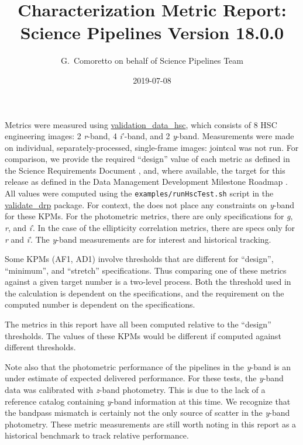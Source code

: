 \documentclass[DM,lsstdraft,toc]{lsstdoc}
\title[V18.0.0 Characterization Report]{Characterization Metric Report: Science Pipelines Version 18.0.0}
\author{G.~Comoretto on behalf of Science Pipelines Team}
\date{2019-07-08}
\begin{document}

\maketitle

Metrics were measured using \href{https://github.com/lsst/validation_data_hsc}{validation\_data\_hsc}, which consists of 8 HSC engineering images: 2 \emph{r}-band, 4 \emph{i}'-band, and 2 \emph{y}-band. Measurements were made on individual, separately-processed, single-frame images: jointcal was not run. For comparison, we provide the \SRD required ``design'' value of each metric as defined in the Science Requirements Document , and, where available, the target for this release as defined in the Data Management Development Milestone Roadmap . All values were computed using the \texttt{examples/runHscTest.sh} script in the \href{https://github.com/lsst/validate_drp}{validate\_drp} package. For context, the \SRD does not place any constraints on \emph{y}-band for these KPMs.  For the photometric metrics, there are only specifications for \emph{g}, \emph{r}, and \emph{i}'. In the case of the ellipticity correlation metrics, there are specs only for \emph{r} and \emph{i}'. The \emph{y}-band measurements are for interest and historical tracking.

Some KPMs (AF1, AD1) involve thresholds that are different for ``design'', ``minimum'', and ``stretch'' specifications. Thus comparing one of these metrics against a given target number is a two-level process. Both the threshold used in the calculation is dependent on the specifications, and the requirement on the computed number is dependent on the specifications.

The metrics in this report have all been computed relative to the ``design'' thresholds. The values of these KPMs would be different if computed against different thresholds.

Note also that the photometric performance of the pipelines in the \emph{y}-band is an under estimate of expected delivered performance.  For these tests, the \emph{y}-band data was calibrated with \emph{z}-band photometry.  This is due to the lack of a reference catalog containing \emph{y}-band information at this time. We recognize that the bandpass mismatch is certainly not the only source of scatter in the \emph{y}-band photometry. These metric measurements are still worth noting in this report as a historical benchmark to track relative performance.
\end{document}
